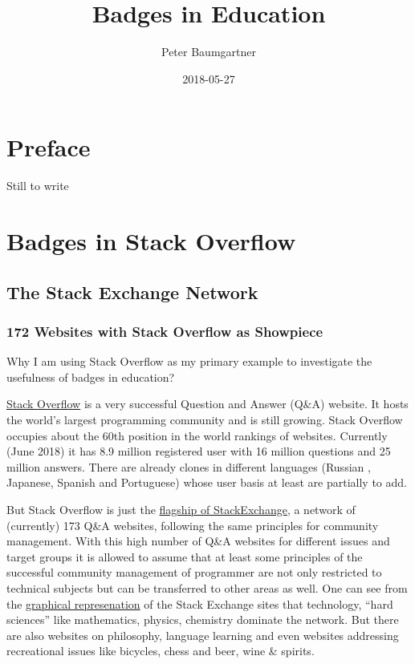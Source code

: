 \documentclass[]{book}
\title{Badges in Education}
\author{Peter Baumgartner}
\date{2018-05-27}
\theoremstyle{definition}
\theoremstyle{definition}
\theoremstyle{definition}
\theoremstyle{remark}
\begin{document}
\maketitle

{
\setcounter{tocdepth}{1}
\tableofcontents
}
\chapter{Preface}\label{preface}

Still to write

\chapter{Badges in Stack Overflow}\label{badges-in-stack-overflow}

\section{The Stack Exchange Network}\label{the-stack-exchange-network}

\subsection{172 Websites with Stack Overflow as
Showpiece}\label{websites-with-stack-overflow-as-showpiece}

Why I am using Stack Overflow as my primary example to investigate the
usefulness of badges in education?

\href{https://stackoverflow.com/}{Stack Overflow} is a very successful
Question and Answer (Q\&A) website. It hosts the world's largest
programming community and is still growing. Stack Overflow occupies
about the 60th position in the world rankings of websites. Currently
(June 2018) it has 8.9 million registered user with 16 million questions
and 25 million answers. There are already clones in different languages
(Russian , Japanese, Spanish and Portuguese) whose user basis at least
are partially to add.

But Stack Overflow is just the
\href{https://stackexchange.com/sites\#traffic}{flagship of
StackExchange}, a network of (currently) 173 Q\&A websites, following
the same principles for community management. With this high number of
Q\&A websites for different issues and target groups it is allowed to
assume that at least some principles of the successful community
management of programmer are not only restricted to technical subjects
but can be transferred to other areas as well. One can see from the
\href{https://stackexchange.com/sites?view=grid\#}{graphical
represenation} of the Stack Exchange sites that technology, ``hard
sciences'' like mathematics, physics, chemistry dominate the network.
But there are also websites on philosophy, language learning and even
websites addressing recreational issues like bicycles, chess and beer,
wine \& spirits.
\end{document}
